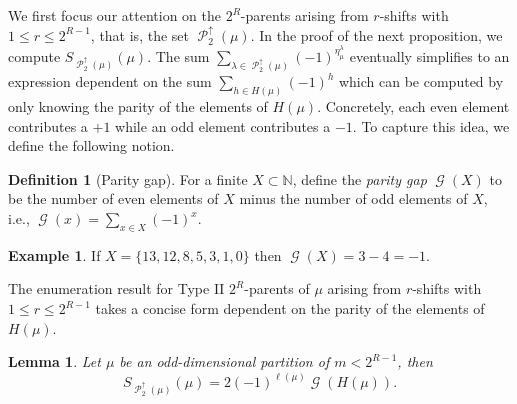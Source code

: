 \documentclass[12pt]{amsart}
\newtheorem{lemma}[theorem]{Lemma}
\theoremstyle{definition}
\newtheorem{definition}[theorem]{Definition}
\newtheorem{example}[theorem]{Example}
\numberwithin{equation}{section}
\newcommand{\la}{\lambda}
\DeclareMathOperator{\p}{\mathcal{P}}
\DeclareMathOperator{\g}{\mathcal{G}}
\begin{document}
We first focus our attention on the $2^R$-parents arising from $r$-shifts with $1\leq r \leq 2^{R-1}$, that is, the set $\p_2^\uparrow(\mu)$. In the proof of the next proposition, we compute $S_{\p_2^\uparrow(\mu)}(\mu)$. The sum $\sum_{\la\in \p_2^\uparrow(\mu)}(-1)^{\eta^\la_\mu}$ eventually simplifies to an expression dependent on the sum $\sum_{h\in H(\mu)} (-1)^h$ which can be computed by only knowing the parity of the elements of $H(\mu)$. Concretely, each even element contributes a $+1$ while an odd element contributes a $-1$. To capture this idea, we define the following notion.
\begin{definition}[Parity gap]
For a finite $X\subset \mathbb{N}$, define the \textit{parity gap} $\g(X)$ to be the number of even elements of $X$ minus the number of odd elements of $X$, i.e., $\g(x) = \sum\limits_{x\in X} (-1)^x$.
\end{definition}
\begin{example}
If $X = \{13, 12, 8, 5, 3, 1, 0\}$ then $\g(X) = 3 - 4 = -1$.
\end{example}
The enumeration result for Type II $2^R$-parents of $\mu$ arising from $r$-shifts with $1\leq r \leq 2^{R-1}$ takes a concise form dependent on the parity of the elements of $H(\mu)$.
\begin{lemma}\label{lem:toprow}
Let $\mu$ be an odd-dimensional partition of $m < 2^{R-1}$, then
\[S_{\p_2^\uparrow(\mu)}(\mu) = 2(-1)^{\ell(\mu)}\g(H(\mu)).\]
\end{lemma}
\end{document}

